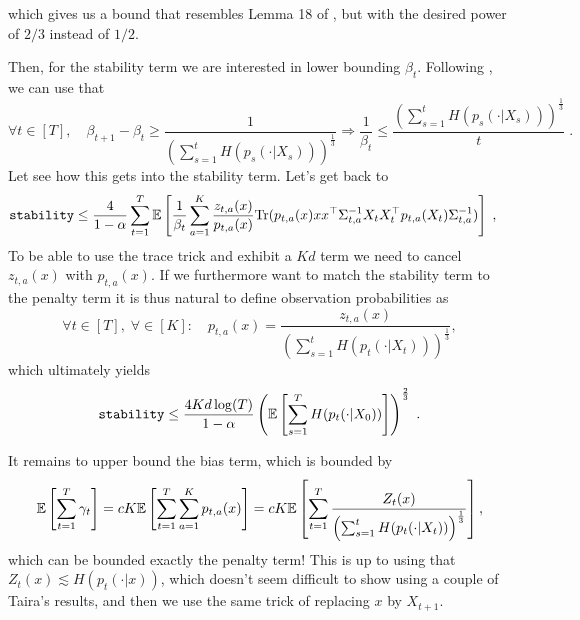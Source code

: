 which gives us a bound that resembles Lemma 18 of \cite{BOBWlinear}, but with the desired power of $2/3$ instead of $1/2$.



Then, for the stability term we are interested in lower bounding $\beta_t$. Following \cite{BOBWlinear}, we can use that 
\[\forall t \in [T], \quad \beta_{t+1}- \beta_t \geq \frac{1}{\left(\sum_{s=1}^{t}H(p_s(\cdot|X_s))\right)^{\frac{1}{3}}} \Longrightarrow \frac{1}{\beta_t} \leq \frac{\left(\sum_{s=1}^{t}H(p_s(\cdot|X_s))\right)^{\frac{1}{3}}}{t}\;.  \]
Let see how this gets into the stability term. Let's get back to  
\begin{align*}
	\texttt{stability} &\leq \frac{4}{1-\alpha} \sum_{t=1}^T \mathbb{E}\left[\frac{1}{\beta_t} \sum_{a=1}^K \frac{z_{t,a}(x)}{p_{t,a}(x)} \text{Tr}(p_{t,a}(x)xx^\top \Sigma_{t,a}^{-1} X_t X_t^\top p_{t,a}(X_t)\Sigma_{t,a}^{-1})\right] \;,
\end{align*}
To be able to use the trace trick and exhibit a $Kd$ term we need to cancel $z_{t,a}(x)$ with $p_{t,a}(x)$. If we furthermore want to match the stability term to the penalty term it is thus natural to define observation probabilities as 
\[\forall t \in [T], \; \forall \in [K]: \quad p_{t,a}(x) = \frac{z_{t,a}(x)}{\left(\sum_{s=1}^{t}H(p_t(\cdot|X_t))\right)^{\frac{1}{3}}}, \]
which ultimately yields 
\[\texttt{stability} \leq \frac{4Kd \log(T)}{1-\alpha } \left(\mathbb{E}\left[\sum_{s=1}^{T}H(p_t(\cdot|X_0))\right]\right)^{\frac{2}{3}} \;. \]

It remains to upper bound the bias term, which is bounded by 
\[\mathbb{E}\left[\sum_{t=1}^T \gamma_t\right] = cK \mathbb{E}\left[\sum_{t=1}^T \sum_{a=1}^K p_{t,a}(x)\right] =cK \mathbb{E}\left[\sum_{t=1}^T \frac{Z_t(x)}{\left(\sum_{s=1}^{t}H(p_t(\cdot|X_t))\right)^{\frac{1}{3}}} \right], \]
which can be bounded exactly the penalty term! This is up to using that $Z_t(x)\lesssim H(p_t(\cdot|x))$, which doesn't seem difficult to show using a couple of Taira's results, and then we use the same trick of replacing $x$ by $X_{t+1}$. 

